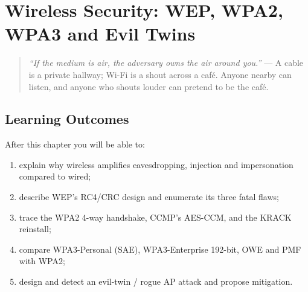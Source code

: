 \chapter{Wireless Security: WEP, WPA2, WPA3 and Evil Twins}\label{ch:wireless}
\begin{quote}
\emph{``If the medium is air, the adversary owns the air around you.''} --- A cable is a private hallway; Wi-Fi is a shout across a caf\'e. Anyone nearby can listen, and anyone who shouts louder can pretend to be the caf\'e.
\end{quote}

\noindent{}
\vspace{0.4em}

\section*{Learning Outcomes}
After this chapter you will be able to:
\begin{enumerate}[label=(L\arabic*)]
    \item explain why wireless amplifies eavesdropping, injection and impersonation compared to wired;
    \item describe WEP's RC4/CRC design and enumerate its three fatal flaws;
    \item trace the WPA2 4-way handshake, CCMP's AES-CCM, and the KRACK reinstall;
    \item compare WPA3-Personal (SAE), WPA3-Enterprise 192-bit, OWE and PMF with WPA2;
    \item design and detect an evil-twin / rogue AP attack and propose mitigation.
\end{enumerate}

